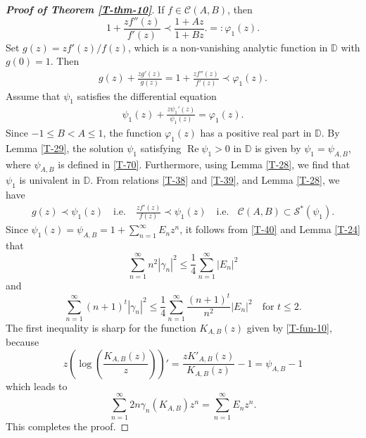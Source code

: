 \documentclass[a4paper,12pt]{amsart}
\theoremstyle{definition}
\begin{document}
\begin{proof}[\textbf{Proof of Theorem \ref{T-thm-10}}]
If $ f \in \mathcal{C}(A,B) $, then
$$
1 + \frac{zf''(z)}{f'(z)} \prec \frac{1+Az}{1+Bz}.=:\varphi_1(z).
$$ 
Set $ g(z) = zf'(z)/f(z) $, which is a non-vanishing analytic function in $\mathbb{D}$ with $ g(0) = 1 $. Then
\begin{align}\label{T-38}
    g(z) + \frac{zg'(z)}{g(z)} =1 + \frac{zf''(z)}{f'(z)} \prec \varphi_1(z). 
\end{align}
Assume that $\psi_1$ satisfies the differential equation
\begin{align}\label{T-39}
\psi_1(z) + \frac{z\psi_1'(z)}{\psi_1(z)} = \varphi_1(z). 
\end{align}
Since $-1\leq B< A \leq 1$, the function $ \varphi_1(z)$ has a positive real part in $ \mathbb{D} $.
By Lemma \ref{T-29}, the solution $\psi_1$ satisfying $\operatorname{Re} \psi_1 >0$ in $\mathbb{D}$ is given by $\psi_1=\psi_{A,B}$, where $\psi_{A,B}$ is defined in \eqref{T-70}. Furthermore, using Lemma \ref{T-28}, we find that $\psi_1$ is univalent in $\mathbb{D}$. From relations \eqref{T-38} and \eqref{T-39}, and Lemma \ref{T-28}, we have
\begin{align}\label{T-40}
g(z) \prec \psi_1(z) \quad \text{i.e.} \quad \frac{zf'(z)}{f(z)} \prec \psi_1(z) \quad \text{i.e.}~~~ ~\mathcal{C}(A,B) \subset \mathcal{S}^*(\psi_1). 
\end{align}
Since $\psi_1(z)=\psi_{A,B} = 1 + \sum_{n=1}^{\infty} E_n z^n$, it follows from \eqref{T-40} and Lemma \ref{T-24} that
$$
\sum_{n=1}^{\infty} n^2 |\gamma_n|^2 \leq \frac{1}{4} \sum_{n=1}^{\infty} |E_n|^2
$$
and 
$$
\sum_{n=1}^{\infty} (n+1)^t |\gamma_n|^2 \leq \frac{1}{4} \sum_{n=1}^{\infty} \frac{(n+1)^t}{n^2} |E_n|^2 \quad \text{for } t \leq 2.
$$
The first inequality is sharp for the function $K_{A,B}(z)$ given by \eqref{T-fun-10}, because
$$
z \left( \log \left( \frac{K_{A,B}(z)}{z} \right) \right)'=\frac{z K'_{A,B}(z)}{K_{A,B}(z)} - 1 =\psi_{A,B}-1
$$
which leads to
$$
\sum_{n=1}^{\infty} 2n \gamma_n(K_{A,B}) z^n =\sum_{n=1}^{\infty} E_n z^n.
$$
This completes the proof.
\end{proof}
\end{document}
